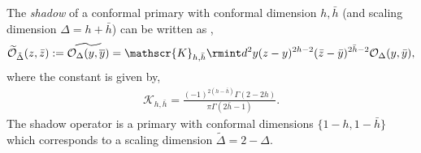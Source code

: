 The \textit{shadow} of a conformal primary with conformal dimension $h,\bar h$ (and scaling dimension $\Delta=h+\bar h$) can be written as \cite{Simmons-Duffin:2012juh,Fan:2023lky},
\begin{align}
\widetilde{\mathcal{O}}_{\tilde\Delta}(z,\bar z):=\widetilde{{\mathcal{O}}_{\Delta}(y,\overline{y})}=\mathscr{K}_{h,\bar h}\rmint d^2y (z-y)^{2h-2}(\bar z-\bar y)^{2\bar h-2}\mathcal{O}_{\Delta}(y,\bar y),
\end{align}
where the constant is given  by,
\begin{align}
    \mathscr{K}_{h,\bar h}=\frac{(-1)^{2(h-\bar h)}\Gamma(2-2h)}{\pi\Gamma(2\bar h -1)}.
\end{align}
The shadow operator is a primary with conformal dimensions $\{1-h,1-\bar h\}$ which corresponds to a scaling dimension $\tilde \Delta=2-\Delta $.
